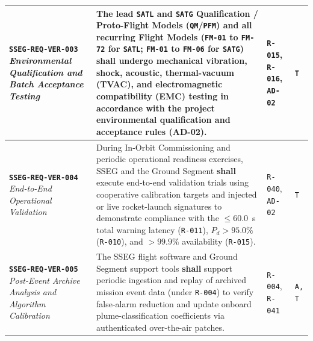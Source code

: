 \documentclass[11pt,a4paper]{article}
\providecommand{\abbr}[1]{#1}
\begin{document}
{\begin{longtable}{|>{\raggedright\arraybackslash}p{}|>{\raggedright\arraybackslash}p{}|>{\raggedright\arraybackslash}p{}|>{\raggedright\arraybackslash}p{}|}
\textbf{\texttt{SSEG-REQ-VER-003}} \newline \emph{Environmental Qualification and Batch Acceptance Testing} & The lead \texttt{SATL} and \texttt{SATG} Qualification / Proto-Flight Models (\texttt{QM}/\texttt{PFM}) and all recurring Flight Models (\texttt{FM-01} to \texttt{FM-72} for \texttt{SATL}; \texttt{FM-01} to \texttt{FM-06} for \texttt{SATG}) \textbf{shall} undergo mechanical vibration, shock, acoustic, thermal-vacuum (\abbr{TVAC}), and electromagnetic compatibility (\abbr{EMC}) testing in accordance with the project environmental qualification and acceptance rules (\textbf{AD-02}). & \texttt{R-015}, \texttt{R-016}, \texttt{AD-02} & \texttt{T} \\ \hline
\textbf{\texttt{SSEG-REQ-VER-004}} \newline \emph{End-to-End} \newline \emph{Operational Validation} & During In-Orbit Commissioning and periodic operational readiness exercises, \abbr{SSEG} and the Ground Segment \textbf{shall} execute end-to-end validation trials using cooperative calibration targets and injected or live rocket-launch signatures to demonstrate compliance with the $\le 60.0$~s total warning latency (\texttt{R-011}), $P_d > 95.0\%$ (\texttt{R-010}), and $> 99.9\%$ availability (\texttt{R-015}). & \texttt{R-040}, \newline \texttt{AD-02} & \texttt{T} \\ \hline
\textbf{\texttt{SSEG-REQ-VER-005}} \newline \emph{Post-Event Archive Analysis and Algorithm Calibration} & The \abbr{SSEG} flight software and Ground Segment support tools \textbf{shall} support periodic ingestion and replay of archived mission event data (under \texttt{R-004}) to verify false-alarm reduction and update onboard plume-classification coefficients via authenticated over-the-air patches. & \texttt{R-004}, \newline \texttt{R-041} & \texttt{A, T} \\ \hline
\end{longtable}}
\end{document}
